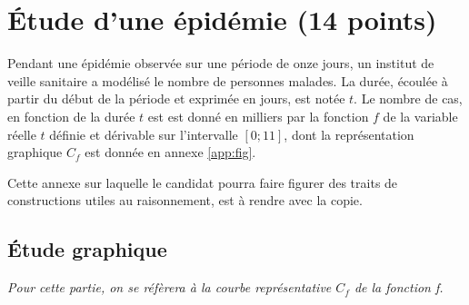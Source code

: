 \section{\'Etude d'une épidémie (14 points)}\label{ex:epidemie}

Pendant une épidémie observée sur une période de onze jours, un institut de veille sanitaire a modélisé le nombre de personnes malades. La durée, écoulée à partir du début de la période et exprimée en jours, est notée $t$. Le nombre de cas, en fonction de la durée $t$ est est donné en milliers par la fonction $f$ de la variable réelle $t$ définie et dérivable sur l'intervalle $\left[0; 11\right]$, dont la représentation graphique $C_f$ est donnée en annexe \ref{app:fig}.

Cette annexe sur laquelle le candidat pourra faire figurer des traits de constructions utiles au raisonnement, est à rendre avec la copie.

\subsection{\'Etude graphique}\label{sec:A}

\emph{Pour cette partie, on se réfèrera à la courbe représentative $C_f$ de la fonction f.}


